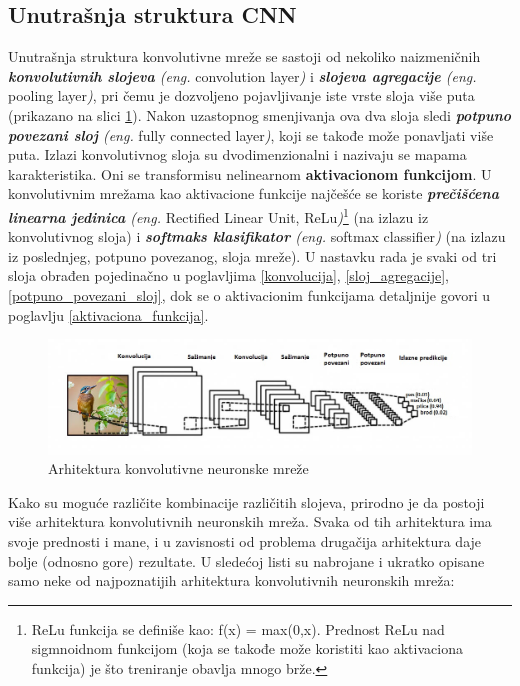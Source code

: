 \documentclass[a4paper]{article}
\begin{document}
\subsection{Unutrašnja struktura CNN}
\label{struktura_cnn}
Unutrašnja struktura konvolutivne mreže se sastoji od nekoliko naizmeničnih \textit{\textbf{konvolutivnih slojeva} (eng.} convolution layer\textit{)} i \textit{\textbf{slojeva agregacije} (eng.} pooling layer\textit{)}, pri čemu je dozvoljeno pojavljivanje iste vrste sloja više puta (prikazano na slici \ref{fig:cnn_layers}). Nakon uzastopnog smenjivanja ova dva sloja sledi \textit{\textbf{potpuno povezani sloj} (eng.} fully connected layer\textit{)}, koji se takođe može ponavljati više puta. Izlazi konvolutivnog sloja su dvodimenzionalni i nazivaju se mapama karakteristika. Oni se transformisu nelinearnom \textbf{aktivacionom funkcijom}. U konvolutivnim mrežama kao aktivacione funkcije najčešće se koriste \textit{\textbf{prečišćena linearna jedinica} (eng.} Rectified Linear Unit, ReLu\textit{)}\footnote{ReLu funkcija se definiše kao: f(x) = max(0,x). Prednost ReLu nad sigmnoidnom funkcijom (koja se takođe može koristiti kao aktivaciona funkcija) je što treniranje obavlja mnogo brže.} (na izlazu iz konvolutivnog sloja) i \textit{\textbf{softmaks klasifikator} (eng.} softmax classifier\textit{)} (na izlazu iz poslednjeg, potpuno povezanog, sloja mreže). U nastavku rada je svaki od tri sloja obrađen pojedinačno u poglavljima \ref{konvolucija}, \ref{sloj_agregacije}, \ref{potpuno_povezani_sloj}, dok se o aktivacionim funkcijama detaljnije govori u poglavlju \ref{aktivaciona_funkcija}.


\begin{figure}[h!]
\begin{center}
\includegraphics[scale=0.62]{cnn_layers.jpg}
\end{center}
\caption{Arhitektura konvolutivne neuronske mreže}
\label{fig:cnn_layers}
\end{figure}

Kako su moguće različite kombinacije različitih slojeva, prirodno je da postoji više arhitektura konvolutivnih neuronskih mreža. Svaka od tih arhitektura ima svoje prednosti i mane, i u zavisnosti od problema drugačija arhitektura daje bolje (odnosno gore) rezultate. U sledećoj listi su nabrojane i ukratko opisane samo neke od najpoznatijih arhitektura konvolutivnih neuronskih mreža:
\end{document}
